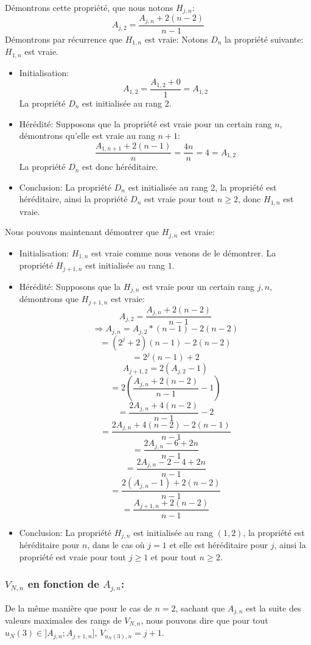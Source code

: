 \medskip

Démontrons cette propriété, que nous notons $H_{j,n}$: $$A_{j,2}=\dfrac{A_{j,n}+2(n-2)}{n-1}$$
Démontrons par récurrence que $H_{1,n}$ est vraie: Notons $D_n$ la propriété suivante: $H_{1,n}$ est vraie.
\begin{itemize}
    \item Initialisation: $$A_{1,2}=\dfrac{A_{1,2}+0}{1}=A_{1,2}$$
    La propriété $D_n$ est initialisée au rang 2.
    \item Hérédité: Supposons que la propriété est vraie pour un certain rang $n$, démontrons qu'elle est vraie au rang $n+1$:
    $$\dfrac{A_{1,n+1}+2(n-1)}{n}=\dfrac{4n}{n}=4=A_{1,2}$$
    La propriété $D_n$ est donc héréditaire.
    \item Conclusion: La propriété $D_n$ est initialisée au rang 2, la propriété est héréditaire, ainsi la propriété $D_n$ est vraie pour tout $n\geq 2$, donc $H_{1,n}$ est vraie.
\end{itemize}
Nous pouvons maintenant démontrer que $H_{j,n}$ est vraie:
\begin{itemize}
    \item Initialisation: $H_{1,n}$ est vraie comme nous venons de le démontrer.
    La propriété $H_{j+1,n}$ est initialisée au rang $1$.
    \item Hérédité: Supposons que la $H_{j,n}$ est vraie pour un certain rang $j,n$, démontrons que $H_{j+1,n}$ est vraie:
    $$A_{j,2}=\dfrac{A_{j,n}+2(n-2)}{n-1}$$
    $$\Rightarrow A_{j,n}=A_{j,2}*(n-1)-2(n-2)$$
    $$=(2^j+2)(n-1)-2(n-2)$$
    $$=2^j(n-1)+2$$
    $$A_{j+1,2}=2(A_{j,2}-1)$$
    $$=2(\dfrac{A_{j,n}+2(n-2)}{n-1}-1)$$
    $$=\dfrac{2A_{j,n}+4(n-2)}{n-1}-2$$
    $$=\dfrac{2A_{j,n}+4(n-2)-2(n-1)}{n-1}$$
    $$=\dfrac{2A_{j,n}-6+2n}{n-1}$$
    $$=\dfrac{2A_{j,n}-2-4+2n}{n-1}$$
    $$=\dfrac{2(A_{j,n}-1)+2(n-2)}{n-1}$$
    $$=\dfrac{A_{j+1,n}+2(n-2)}{n-1}$$
    \item Conclusion: La propriété $H_{j,n}$ est initialisée au rang $(1,2)$, la propriété est héréditaire pour $n$, dans le cas où $j=1$ et elle est héréditaire pour $j$, ainsi la propriété est vraie pour tout $j\geq 1$ et pour tout $n\geq 2$.
\end{itemize}
\subsubsection{$V_{N,n}$ en fonction de $A_{j,n}$:}
De la même manière que pour le cas de $n=2$, sachant que $A_{j,n}$ est la suite des valeurs maximales des rangs de $V_{N,n}$, nous pouvons dire que pour tout $u_N(3)\in ]A_{j,n};A_{j+1,n}]$, $V_{u_N(3),n}=j+1$.

